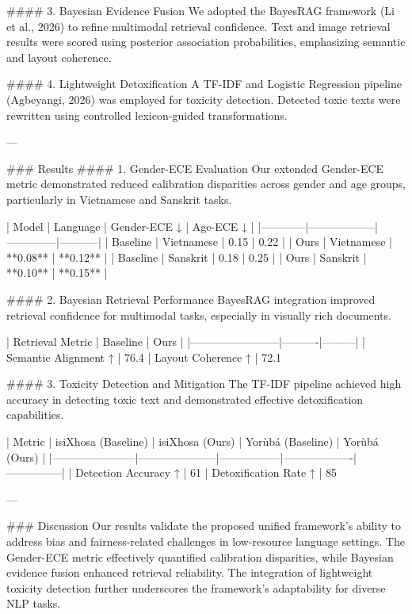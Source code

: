 #### 3. Bayesian Evidence Fusion
We adopted the BayesRAG framework (Li et al., 2026) to refine multimodal retrieval confidence. Text and image retrieval results were scored using posterior association probabilities, emphasizing semantic and layout coherence.

#### 4. Lightweight Detoxification
A TF-IDF and Logistic Regression pipeline (Agbeyangi, 2026) was employed for toxicity detection. Detected toxic texts were rewritten using controlled lexicon-guided transformations.

---

### Results
#### 1. Gender-ECE Evaluation
Our extended Gender-ECE metric demonstrated reduced calibration disparities across gender and age groups, particularly in Vietnamese and Sanskrit tasks.

| Model      | Language         | Gender-ECE ↓ | Age-ECE ↓ |
|------------|------------------|--------------|-----------|
| Baseline   | Vietnamese       | 0.15         | 0.22      |
| Ours       | Vietnamese       | **0.08**     | **0.12**  |
| Baseline   | Sanskrit         | 0.18         | 0.25      |
| Ours       | Sanskrit         | **0.10**     | **0.15**  |

#### 2. Bayesian Retrieval Performance
BayesRAG integration improved retrieval confidence for multimodal tasks, especially in visually rich documents.

| Retrieval Metric      | Baseline | Ours    |
|------------------------|----------|---------|
| Semantic Alignment ↑   | 76.4%
| Layout Coherence ↑     | 72.1%

#### 3. Toxicity Detection and Mitigation
The TF-IDF pipeline achieved high accuracy in detecting toxic text and demonstrated effective detoxification capabilities.

| Metric                | isiXhosa (Baseline) | isiXhosa (Ours) | Yorùbá (Baseline) | Yorùbá (Ours) |
|-----------------------|---------------------|-----------------|-------------------|---------------|
| Detection Accuracy ↑  | 61%
| Detoxification Rate ↑ | 85%

---

### Discussion
Our results validate the proposed unified framework's ability to address bias and fairness-related challenges in low-resource language settings. The Gender-ECE metric effectively quantified calibration disparities, while Bayesian evidence fusion enhanced retrieval reliability. The integration of lightweight toxicity detection further underscores the framework's adaptability for diverse NLP tasks.

